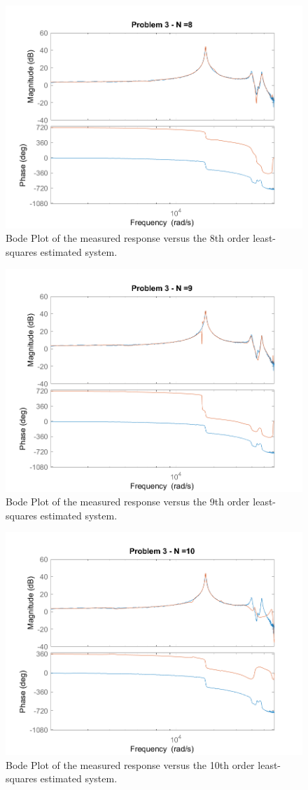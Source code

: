 \documentclass[]{article}
\begin{document}
		\begin{figure}[h]
			\centering
			\includegraphics[width=0.7\linewidth]{fig/MECH6325_CA1_pblm3_n=8}
			\caption{Bode Plot of the measured response versus the 8th order least-squares estimated system.}
			\label{fig:pblm3_n=8}
		\end{figure}
	
		\begin{figure}[h]	
			\centering
			\includegraphics[width=0.7\linewidth]{fig/MECH6325_CA1_pblm3_n=9}
			\caption{Bode Plot of the measured response versus the 9th order least-squares estimated system.}
			\label{fig:pblm3_n=9}
		\end{figure}

		\begin{figure}[h]
			\centering
			\includegraphics[width=0.7\linewidth]{fig/MECH6325_CA1_pblm3_n=10}
			\caption{Bode Plot of the measured response versus the 10th order least-squares estimated system.}
			\label{fig:pblm3_n=10}
		\end{figure}
\end{document}
